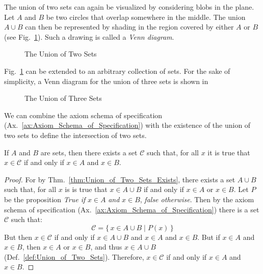         The union of two sets can again be visualized by considering blobs
        in the plane. Let $A$ and $B$ be two circles that overlap somewhere in
        the middle. The union $A\cup{B}$ can then be represented by shading in
        the region covered by either $A$ or $B$
        (see Fig.~\ref{fig:Union_of_Two_Sets}). Such a drawing is called a
        \textit{Venn diagram}.
        \begin{figure}[H]
            \centering
            \captionsetup{type=figure}
            
            \caption{The Union of Two Sets}
            \label{fig:Union_of_Two_Sets}
        \end{figure}
        Fig.~\ref{fig:Union_of_Two_Sets} can be extended to an
        arbitrary collection of sets. For the sake of simplicity, a Venn
        diagram for the union of three sets is shown in
        \begin{figure}[H]
            \centering
            \captionsetup{type=figure}
            
            \caption{The Union of Three Sets}
            \label{fig:Union_of_Three_Sets}
        \end{figure}
        We can combine the axiom schema of specification
        (Ax.~\ref{ax:Axiom_Schema_of_Specification}) with the existence of
        the union of two sets to define the intersection of two sets.
        \begin{theorem}
            If $A$ and $B$ are sets, then there exists a set $\mathcal{C}$
            such that, for all $x$ it is true that $x\in\mathcal{C}$ if and
            only if $x\in{A}$ and $x\in{B}$.
        \end{theorem}
        \begin{proof}
            For by Thm.~\ref{thm:Union_of_Two_Sets_Exists}, there exists
            a set $A\cup{B}$ such that, for all $x$ is is true that
            $x\in{A}\cup{B}$ if and only if $x\in{A}$ or $x\in{B}$. Let
            $P$ be the proposition \textit{True if} $x\in{A}$ \textit{and}
            $x\in{B}$, \textit{false otherwise}. Then by the axiom schema
            of specification (Ax.~\ref{ax:Axiom_Schema_of_Specification})
            there is a set $\mathcal{C}$ such that:
            \begin{equation}
                \mathcal{C}=\big\{\,x\in{A}\cup{B}\;|\;P(x)\,\big\}
            \end{equation}
            But then $x\in\mathcal{C}$ if and only if $x\in{A}\cup{B}$ and
            $x\in{A}$ and $x\in{B}$. But if $x\in{A}$ and $x\in{B}$, then
            $x\in{A}$ or $x\in{B}$, and thus $x\in{A}\cup{B}$
            (Def.~\ref{def:Union_of_Two_Sets}). Therefore, $x\in\mathcal{C}$
            if and only if $x\in{A}$ and $x\in{B}$.
        \end{proof}
